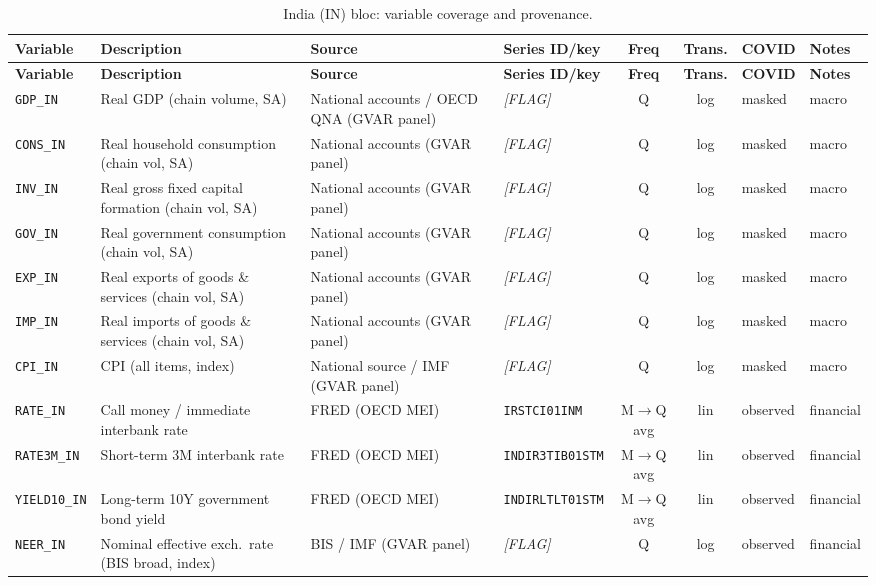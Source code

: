 {\footnotesize
\begin{longtable}{@{}llp{2.5cm}p{2.4cm}cclp{2.6cm}@{}}
\caption{India (IN) bloc: variable coverage and provenance.}\label{tab:data:IN}\\
\toprule
\textbf{Variable} & \textbf{Description} & \textbf{Source} & \textbf{Series ID/key} & \textbf{Freq} & \textbf{Trans.} & \textbf{COVID} & \textbf{Notes} \\
\midrule
\endfirsthead
\toprule
\textbf{Variable} & \textbf{Description} & \textbf{Source} & \textbf{Series ID/key} & \textbf{Freq} & \textbf{Trans.} & \textbf{COVID} & \textbf{Notes} \\
\midrule
\endhead
\bottomrule
\endfoot
\texttt{GDP\_IN}  & Real GDP (chain volume, SA) & National accounts / OECD QNA (GVAR panel) & \textit{[FLAG]} & Q & log & masked & macro \\
\texttt{CONS\_IN} & Real household consumption (chain vol, SA) & National accounts (GVAR panel) & \textit{[FLAG]} & Q & log & masked & macro \\
\texttt{INV\_IN}  & Real gross fixed capital formation (chain vol, SA) & National accounts (GVAR panel) & \textit{[FLAG]} & Q & log & masked & macro \\
\texttt{GOV\_IN}  & Real government consumption (chain vol, SA) & National accounts (GVAR panel) & \textit{[FLAG]} & Q & log & masked & macro \\
\texttt{EXP\_IN}  & Real exports of goods \& services (chain vol, SA) & National accounts (GVAR panel) & \textit{[FLAG]} & Q & log & masked & macro \\
\texttt{IMP\_IN}  & Real imports of goods \& services (chain vol, SA) & National accounts (GVAR panel) & \textit{[FLAG]} & Q & log & masked & macro \\
\texttt{CPI\_IN}  & CPI (all items, index) & National source / IMF (GVAR panel) & \textit{[FLAG]} & Q & log & masked & macro \\
\texttt{RATE\_IN} & Call money / immediate interbank rate & FRED (OECD MEI) & \texttt{IRSTCI01INM} & M$\to$Q avg & lin & observed & financial \\
\texttt{RATE3M\_IN} & Short-term 3M interbank rate & FRED (OECD MEI) & \texttt{INDIR3TIB01STM} & M$\to$Q avg & lin & observed & financial \\
\texttt{YIELD10\_IN} & Long-term 10Y government bond yield & FRED (OECD MEI) & \texttt{INDIRLTLT01STM} & M$\to$Q avg & lin & observed & financial \\
\texttt{NEER\_IN} & Nominal effective exch.\ rate (BIS broad, index) & BIS / IMF (GVAR panel) & \textit{[FLAG]} & Q & log & observed & financial \\

\end{longtable}}
